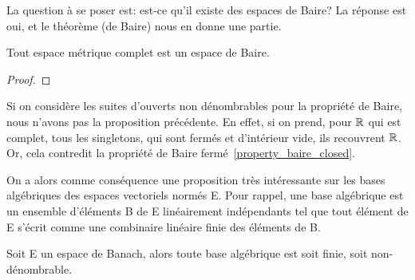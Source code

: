 La question à se poser est: est-ce qu'il existe des espaces de Baire? La
réponse est oui, et le théorème (de Baire) nous en donne une partie.

\begin{theorem} 
\label{theorem_baire_complete_space}
	Tout espace métrique complet est un espace de Baire.
\end{theorem}

\ifdefined\outputproof
\begin{proof}
	
\end{proof}
\fi

\begin{remarque}
	Si on considère les suites d'ouverts non dénombrables pour la propriété de
	Baire, nous n'avons pas la proposition précédente.
	En effet, si on prend, pour $\mathbb{R}$ qui est complet, tous les singletons,
	qui sont fermés et d'intérieur vide, ils recouvrent $\mathbb{R}$. Or, cela
	contredit la propriété de Baire fermé~\ref{property_baire_closed}.
\end{remarque}

On a alors comme conséquence une proposition très intéressante sur les bases
algébriques des espaces vectoriels normés E. Pour rappel, une base algébrique
est un ensemble d'éléments B de E linéairement indépendants tel que tout élément
de E s'écrit comme une combinaire linéaire finie des éléments de B.

\begin{proposition}
\label{proposition_basis_banach_space}
	Soit E un espace de Banach, alors toute base algébrique est soit finie, soit
	non-dénombrable.
\end{proposition}

